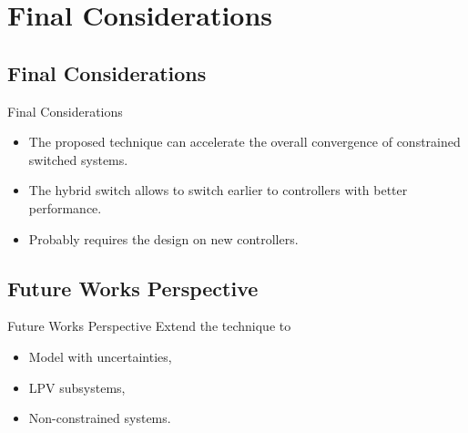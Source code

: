 
\section{Final Considerations}%
\label{sec:conclusion}

\subsection{Final Considerations}%
\label{subsec:conclusion}

\begin{slide}{Final Considerations}
  \begin{itemize}
    \item The proposed technique can accelerate the overall convergence of
          constrained switched systems.
    \item The hybrid switch allows to switch earlier to controllers with better
          performance.
    \item Probably requires the design on new controllers.
  \end{itemize}
\end{slide}

\subsection{Future Works Perspective}%
\label{subsec:future-works}

\begin{slide}{Future Works Perspective}
  Extend the technique to
  \begin{itemize}
    \item Model with uncertainties,
    \item LPV subsystems,
    \item Non-constrained systems.
  \end{itemize}
\end{slide}
